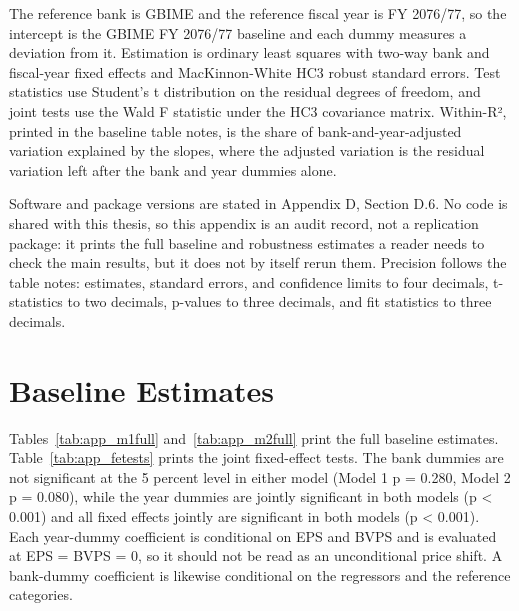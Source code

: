The reference bank is GBIME and the reference fiscal year is FY 2076/77, so the intercept is the GBIME FY 2076/77 baseline and each dummy measures a deviation from it. Estimation is ordinary least squares with two-way bank and fiscal-year fixed effects and MacKinnon-White HC3 robust standard errors. Test statistics use Student's t distribution on the residual degrees of freedom, and joint tests use the Wald F statistic under the HC3 covariance matrix. Within-R², printed in the baseline table notes, is the share of bank-and-year-adjusted variation explained by the slopes, where the adjusted variation is the residual variation left after the bank and year dummies alone.

Software and package versions are stated in Appendix D, Section D.6. No code is shared with this thesis, so this appendix is an audit record, not a replication package: it prints the full baseline and robustness estimates a reader needs to check the main results, but it does not by itself rerun them. Precision follows the table notes: estimates, standard errors, and confidence limits to four decimals, t-statistics to two decimals, p-values to three decimals, and fit statistics to three decimals.

\section{Baseline Estimates}

Tables~\ref{tab:app_m1full} and~\ref{tab:app_m2full} print the full baseline estimates. Table~\ref{tab:app_fetests} prints the joint fixed-effect tests. The bank dummies are not significant at the 5 percent level in either model (Model 1 p = 0.280, Model 2 p = 0.080), while the year dummies are jointly significant in both models (p < 0.001) and all fixed effects jointly are significant in both models (p < 0.001). Each year-dummy coefficient is conditional on EPS and BVPS and is evaluated at EPS = BVPS = 0, so it should not be read as an unconditional price shift. A bank-dummy coefficient is likewise conditional on the regressors and the reference categories.

